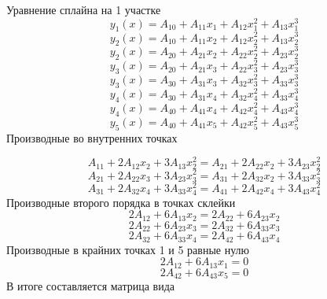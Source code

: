 \documentclass[russian,utf8,nocolumnxxxi,nocolumnxxxii]{eskdtext}
\begin{document}
Уравнение сплайна на 1 участке
\begin{equation}
y_1(x) =A_{10}+A_{11}x_1+A_{12}x^2_1+A_{13}x^3_1
\end{equation}
\begin{equation}
y_2(x) =A_{10}+A_{11}x_2+A_{12}x^2_2+A_{13}x^3_2
\end{equation}
\begin{equation}
y_2(x) =A_{20}+A_{21}x_2+A_{22}x^2_2+A_{23}x^3_2
\end{equation}
\begin{equation}
y_3(x) =A_{20}+A_{21}x_3+A_{22}x^2_3+A_{23}x^3_3
\end{equation}
\begin{equation}
y_3(x) =A_{30}+A_{31}x_3+A_{32}x^2_3+A_{33}x^3_3
\end{equation}
\begin{equation}
y_4(x) =A_{30}+A_{31}x_4+A_{32}x^2_4+A_{33}x^3_4
\end{equation}
\begin{equation}
y_4(x) =A_{40}+A_{41}x_4+A_{42}x^2_4+A_{43}x^3_4
\end{equation}
\begin{equation}
y_5(x) =A_{40}+A_{41}x_5+A_{42}x^2_5+A_{43}x^3_5
\end{equation}
Производные во внутренних точках

\begin{equation}
A_{11} + 2A_{12}x_2 + 3A_{13}x^2_2=A_{21} + 2A_{22}x_2 + 3A_{23}x^2_2
\end{equation}
\begin{equation}
A_{21} + 2A_{22}x_3 + 3A_{23}x^2_3= A_{31} + 2A_{32}x_2 + 3A_{33}x^2_3
\end{equation}
\begin{equation}
A_{31} + 2A_{32}x_4 + 3A_{33}x^2_4= A_{41} + 2A_{42}x_4 + 3A_{43}x^2_4
\end{equation}
Производные второго порядка в точках склейки
\begin{equation}
2A_{12} + 6A_{13}x_2=2A_{22} + 6A_{23}x_2
\end{equation}
\begin{equation}
2A_{22} + 6A_{23}x_3= 2A_{32} + 6A_{33}x_3
\end{equation}
\begin{equation}
2A_{32} + 6A_{33}x_4= 2A_{42} + 6A_{43}x_4
\end{equation}
Производные в крайних точках 1 и 5 равные нулю 
\begin{equation}
2A_{12} + 6A_{13}x_1=0
\end{equation}
\begin{equation}
2A_{42} + 6A_{43}x_5= 0
\end{equation}
В итоге составляется матрица вида
\end{document}
